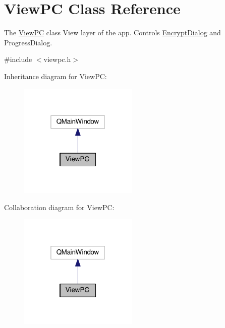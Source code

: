 \hypertarget{class_view_p_c}{}\section{View\+PC Class Reference}
\label{class_view_p_c}


The \hyperlink{class_view_p_c}{View\+PC} class View layer of the app. Controls \hyperlink{class_encrypt_dialog}{Encrypt\+Dialog} and Progress\+Dialog.  




{\ttfamily \#include $<$viewpc.\+h$>$}



Inheritance diagram for View\+PC\+:
\nopagebreak
\begin{figure}[H]
\begin{center}
\leavevmode
\includegraphics[width=160pt]{class_view_p_c__inherit__graph}
\end{center}
\end{figure}


Collaboration diagram for View\+PC\+:
\nopagebreak
\begin{figure}[H]
\begin{center}
\leavevmode
\includegraphics[width=160pt]{class_view_p_c__coll__graph}
\end{center}
\end{figure}
